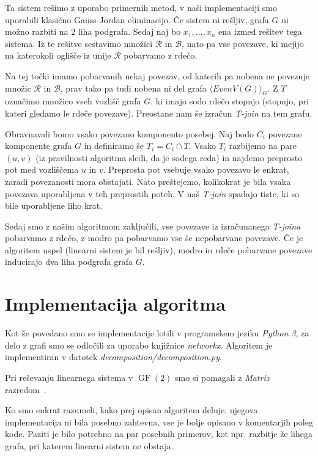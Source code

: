 \documentclass[12pt,a4paper]{amsart}
\theoremstyle{definition} %
\theoremstyle{plain} %
\newcommand{\B}{\mathcal B}
\newcommand{\R}{\mathcal R}
\DeclareMathOperator{\GF}{GF}
\begin{document}
Ta sistem rešimo z uporabo primernih metod, v naši implementaciji smo uporabili klasično Gauss-Jordan eliminacijo.
Če sistem ni rešljiv, grafa $G$ ni možno razbiti na 2 liha podgrafa. Sedaj naj bo $x_1, \ldots, x_n$ ena izmed rešitev tega sistema.
Iz te rešitve sestavimo množici $\R$ in $\B$, nato pa vse povezave, ki mejijo na katerokoli oglišče iz unije $\R$ pobarvamo z rdečo.

Na tej točki imamo pobarvanih nekaj povezav, od katerih pa nobena ne povezuje množic $\R$ in $\B$, prav tako pa tudi nobena
ni del grafa $\langle EvenV(G) \rangle_G$. Z $T$ označimo množico vseh vozlišč grafa $G$, ki imajo sodo rdečo stopnjo (stopnjo, pri kateri gledamo le rdeče povezave).
Preostane nam še izračun \emph{T-join} na tem grafu.

Obravnavali bomo vsako povezano komponento posebej. Naj bodo $C_i$ povezane komponente grafa $G$ in definiramo še $T_i = C_i \cap T$.
Vsako $T_i$ razbijemo na pare $(u, v)$ (iz pravilnosti algoritma sledi, da je sodega reda) in najdemo preprosto pot med vozliščema $u$ in $v$.
Preprosta pot vsebuje vsako povezavo le enkrat, zaradi povezanosti mora obstajati.
Nato preštejemo, kolikokrat je bila vsaka povezava uporabljena v teh preprostih poteh. V naš \emph{T-join} spadajo tiste, ki so bile uporabljene liho krat.

Sedaj smo z našim algoritmom zaključili, vse povezave iz izračunanega \emph{T-joina} pobarvamo z rdečo,
z modro pa pobarvamo vse še nepobarvane povezave. Če je algoritem uspel (linearni sistem je bil rešljiv), modro in rdeče
pobarvane povezave inducirajo dva liha podgrafa grafa $G$. %


\section{Implementacija algoritma}
Kot že povedano smo se implementacije lotili v programskem jeziku \emph{Python 3}, za delo z grafi smo se odločili za uporabo knjižnice \emph{networkx}.
Algoritem je implementiran v datotek \emph{decomposition/decomposition.py}.

Pri reševanju linearnega sistema v $\GF(2)$ smo si pomagali z \emph{Matrix} razredom~\cite{field}.

Ko smo enkrat razumeli, kako prej opisan algoritem deluje, njegova implementacija ni bila posebno zahtevna, vse je bolje opisano v komentarjih poleg kode.
Paziti je bilo potrebno na par posebnih primerov, kot npr. razbitje že lihega grafa, pri katerem linearni sistem ne obstaja.
\end{document}
